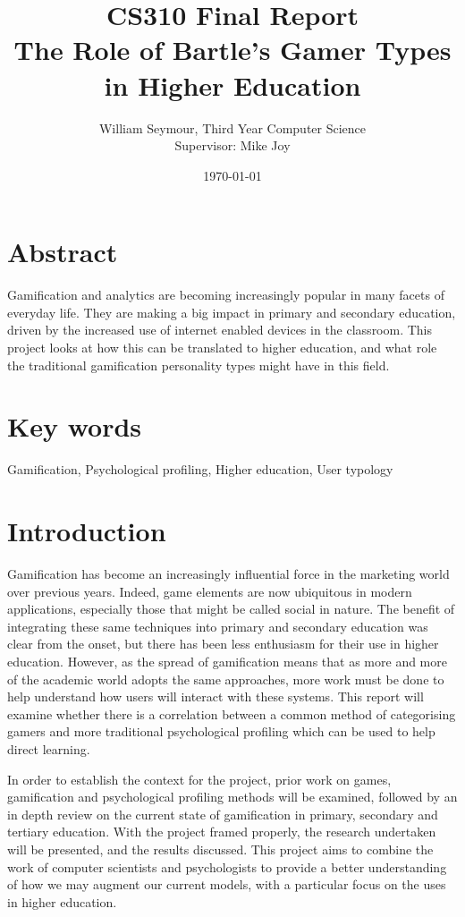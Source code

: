 \documentclass[12pt]{article}
\title{CS310 Final Report \\ The Role of Bartle's Gamer Types in Higher Education}
\author{William Seymour, Third Year Computer Science \\ Supervisor: Mike Joy}
\date{\today}
\begin{document}
\maketitle
\clearpage
\tableofcontents
\listoffigures
\listoftables

\section{Abstract}
Gamification and analytics are becoming increasingly popular in many facets of everyday life. They are making a big impact in primary and secondary education, driven by the increased use of internet enabled devices in the classroom. This project looks at how this can be translated to higher education, and what role the traditional gamification personality types might have in this field.

\section{Key words}
Gamification, Psychological profiling, Higher education, User typology

\section{Introduction}
Gamification has become an increasingly influential force in the marketing world over previous years. Indeed, game elements are now ubiquitous in modern applications, especially those that might be called social in nature. The benefit of integrating these same techniques into primary and secondary education was clear from the onset, but there has been less enthusiasm for their use in higher education. However, as the spread of gamification means that as more and more of the academic world adopts the same approaches, more work must be done to help understand how users will interact with these systems. This report will examine whether there is a correlation between a common method of categorising gamers and more traditional psychological profiling which can be used to help direct learning.

In order to establish the context for the project, prior work on games, gamification and psychological profiling methods will be examined, followed by an in depth review on the current state of gamification in primary, secondary and tertiary education. With the project framed properly, the research undertaken will be presented, and the results discussed. This project aims to combine the work of computer scientists and psychologists to provide a better understanding of how we may augment our current models, with a particular focus on the uses in higher education.
\end{document}

